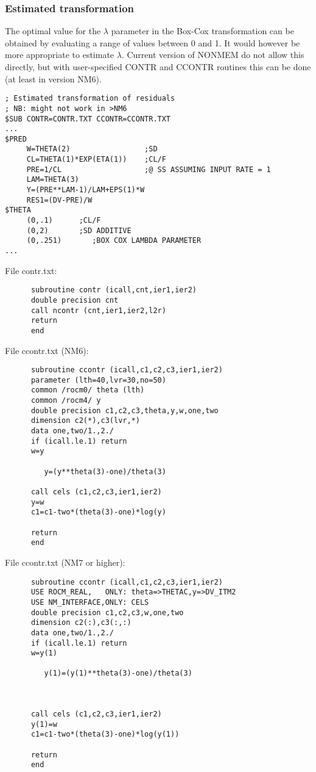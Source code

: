\documentclass[a4paper,11pt]{article}
\begin{document}
\subsubsection*{Estimated transformation}
The optimal value for the $\lambda$ parameter in the Box-Cox
transformation can be obtained by evaluating a range of values between
0 and 1. It would however be more appropriate to estimate
$\lambda$. Current version of NONMEM do not allow this directly, but
with user-specified CONTR and CCONTR routines this can be done (at
least in version NM6).

\begin{lstlisting}
; Estimated transformation of residuals
; NB: might not work in >NM6
$SUB CONTR=CONTR.TXT CCONTR=CCONTR.TXT
...
$PRED
     W=THETA(2)                 ;SD
     CL=THETA(1)*EXP(ETA(1))    ;CL/F
     PRE=1/CL                   ;@ SS ASSUMING INPUT RATE = 1 
     LAM=THETA(3)
     Y=(PRE**LAM-1)/LAM+EPS(1)*W
     RES1=(DV-PRE)/W
$THETA
     (0,.1)      ;CL/F
     (0,2)       ;SD ADDITIVE
     (0,.251)       ;BOX COX LAMBDA PARAMETER
...
\end{lstlisting}

File contr.txt:

\begin{lstlisting}
      subroutine contr (icall,cnt,ier1,ier2)
      double precision cnt
      call ncontr (cnt,ier1,ier2,l2r)
      return
      end
\end{lstlisting}

File ccontr.txt (NM6):

\begin{lstlisting}
      subroutine ccontr (icall,c1,c2,c3,ier1,ier2)
      parameter (lth=40,lvr=30,no=50)
      common /rocm0/ theta (lth)
      common /rocm4/ y
      double precision c1,c2,c3,theta,y,w,one,two
      dimension c2(*),c3(lvr,*)
      data one,two/1.,2./
      if (icall.le.1) return
      w=y
     
         y=(y**theta(3)-one)/theta(3)

      call cels (c1,c2,c3,ier1,ier2)
      y=w
      c1=c1-two*(theta(3)-one)*log(y)
      
      return
      end
\end{lstlisting}

File ccontr.txt (NM7 or higher):
\begin{lstlisting}
      subroutine ccontr (icall,c1,c2,c3,ier1,ier2)
      USE ROCM_REAL,   ONLY: theta=>THETAC,y=>DV_ITM2
      USE NM_INTERFACE,ONLY: CELS
      double precision c1,c2,c3,w,one,two
      dimension c2(:),c3(:,:)
      data one,two/1.,2./
      if (icall.le.1) return
      w=y(1)
      
         y(1)=(y(1)**theta(3)-one)/theta(3)
         
      
      
      call cels (c1,c2,c3,ier1,ier2)
      y(1)=w
      c1=c1-two*(theta(3)-one)*log(y(1))
      
      return
      end
\end{lstlisting}
\end{document}
